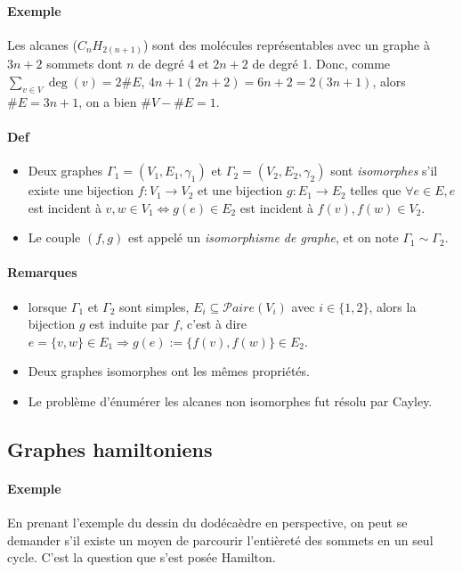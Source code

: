 \documentclass{article}
\newenvironment{lst}
	{\begin{minipage}[t]{.9\linewidth}\begin{itemize}}
	{\end{itemize}\end{minipage}}
\begin{document}
			\paragraph{Exemple} Les alcanes ($C_nH_{2(n+1)}$) sont des molécules représentables avec un graphe à $3n + 2$ sommets dont $n$ de degré 4 et $2n + 2$ de
			degré 1. Donc, comme $\sum_{v \in V}\deg(v) = 2\#E$, $4n + 1(2n + 2) = 6n + 2 = 2(3n+1)$, alors $\#E = 3n+1$, on a bien $\#V - \#E = 1$.

			\paragraph{Def}
				\begin{lst}
					\item Deux graphes $\Gamma_1 = (V_1, E_1, \gamma_1)$ et $\Gamma_2 = (V_2, E_2, \gamma_2)$ sont \textit{isomorphes} s'il existe une
					bijection $f : V_1 \to V_2$ et une bijection $g : E_1 \to E_2$ telles que $\forall e \in E, e$ est incident à
					$v, w \in V_1 \Leftrightarrow g(e) \in E_2 $ est incident à $f(v), f(w) \in V_2$.

					\item Le couple $(f, g)$ est appelé un \textit{isomorphisme de graphe}, et on note $\Gamma_1 \sim \Gamma_2$.
				\end{lst}

			\paragraph{Remarques}
				\begin{lst}
					\item lorsque $\Gamma_1$ et $\Gamma_2$ sont simples, $E_i \subseteq \mathcal Paire(V_i)$ avec $i \in \{1, 2\}$, alors la bijection
						  $g$ est induite par $f$, c'est à dire $e = \{v, w\} \in E_1 \Rightarrow g(e) := \{f(v), f(w)\} \in E_2$.

					\item Deux graphes isomorphes ont les mêmes propriétés.

					\item Le problème d'énumérer les alcanes non isomorphes fut résolu par Cayley.
				\end{lst}


		\subsection{Graphes hamiltoniens}
			\paragraph{Exemple} En prenant l'exemple du dessin du dodécaèdre en perspective, on peut se demander s'il existe un moyen de parcourir
			l'entièreté des sommets en un seul cycle. C'est la question que s'est posée Hamilton.
\end{document}
